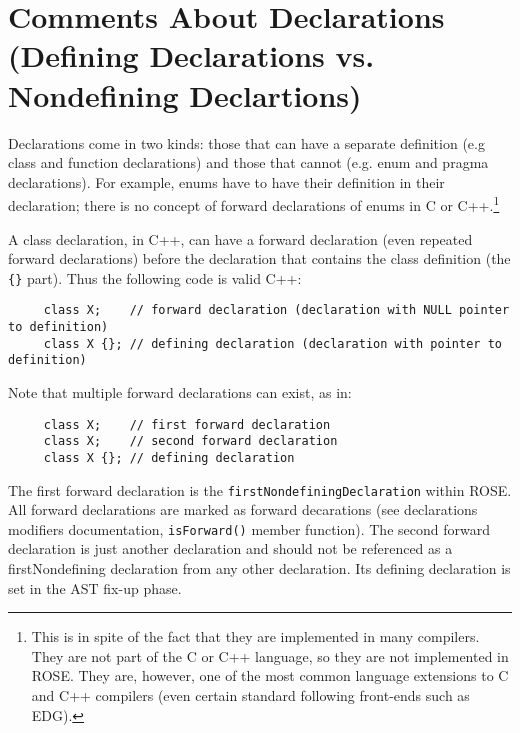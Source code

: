 \section{Comments About Declarations (Defining Declarations vs. Nondefining Declartions) }

    Declarations come in two kinds: those that can have a separate definition (e.g class
and function declarations) and those that cannot (e.g. enum and pragma declarations).
For example, enums have to have their definition in their declaration; there is no concept of
forward declarations of enums in C or C++.\footnote{This is in spite of the fact that they
    are implemented in many compilers. They are not part of the C or C++ language, so 
they are not implemented in ROSE.  They are, however, one of the most common language
extensions to C and C++ compilers (even certain standard following front-ends such as EDG).}

A class declaration, in C++, can have a forward declaration (even repeated forward declarations)
before the declaration that contains the class definition (the {\tt \{\}} part).  Thus 
the following code is valid C++:
{\indent
{\mySmallFontSize
\begin{verbatim}
     class X;    // forward declaration (declaration with NULL pointer to definition)
     class X {}; // defining declaration (declaration with pointer to definition)
\end{verbatim}
}}
Note that multiple forward declarations can exist, as in:
{\indent
{\mySmallFontSize
\begin{verbatim}
     class X;    // first forward declaration
     class X;    // second forward declaration
     class X {}; // defining declaration
\end{verbatim}
}}
   The first forward declaration is the {\tt firstNondefiningDeclaration} within ROSE.
All forward declarations are marked as forward decarations (see declarations modifiers
documentation, {\tt isForward()} member function). The second forward declaration is just 
another declaration and should not be referenced as a firstNondefining declaration from
any other declaration. Its defining declaration is set in the AST fix-up phase.

